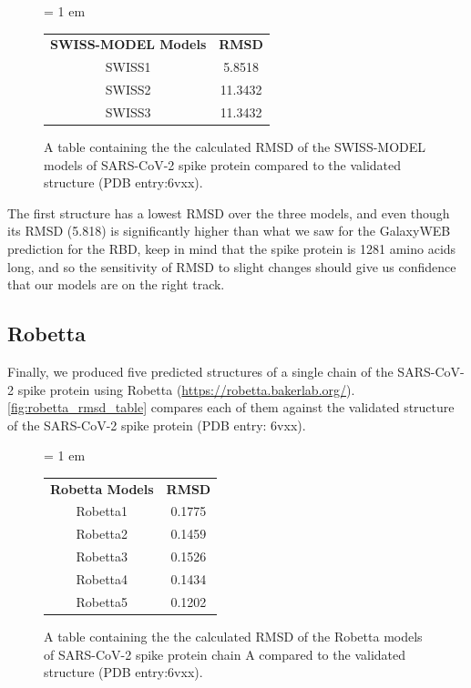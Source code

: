 {{\begin{figure}[h]
\centering
\tabcolsep = 1 em
\mySfFamily
\begin{tabular}{c c}
\textbf{SWISS-MODEL Models} & \textbf{RMSD} \\
SWISS1 & 5.8518 \\
SWISS2 & 11.3432 \\
SWISS3 & 11.3432 \\
\end{tabular}
\caption{A table containing the the calculated RMSD of the SWISS-MODEL models of SARS-CoV-2 spike protein compared to the validated structure (PDB entry:6vxx).}
\label{fig:swiss_rmsd_table}
\end{figure}

The first structure has a lowest RMSD over the three models, and even though its RMSD (5.818) is significantly higher than what we saw for the GalaxyWEB prediction for the RBD, keep in mind that the spike protein is 1281 amino acids long, and so the sensitivity of RMSD to slight changes should give us confidence that our models are on the right track.

\FloatBarrier
{}
\subsection{Robetta}

Finally, we produced five predicted structures of a single chain of the SARS-CoV-2 spike protein using Robetta (\url{https://robetta.bakerlab.org/}). \autoref{fig:robetta_rmsd_table} compares each of them against the validated structure of the SARS-CoV-2 spike protein (PDB entry: 6vxx).

\begin{figure}[h]
\centering
\tabcolsep = 1 em
\mySfFamily
\begin{tabular}{c c}
\textbf{Robetta Models} & \textbf{RMSD} \\
Robetta1 & 0.1775 \\
Robetta2 & 0.1459 \\
Robetta3 & 0.1526 \\
Robetta4 & 0.1434 \\
Robetta5 & 0.1202 \\
\end{tabular}
\caption{A table containing the the calculated RMSD of the Robetta models of SARS-CoV-2 spike protein chain A compared to the validated structure (PDB entry:6vxx).}
\label{fig:robetta_rmsd_table}
\end{figure}

}}
